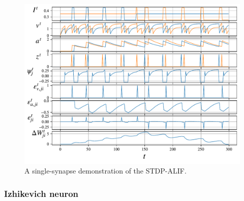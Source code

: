 	        \begin{figure}[!ht]
	            \centering
	            \includegraphics[width=\linewidth]{gfx/stdpalif}
	            \caption{A single-synapse demonstration of the STDP-ALIF.}
	            \label{fig:stdpalif}
	        \end{figure}

		\subsubsection{Izhikevich neuron}\label{sec:izhikevich}

